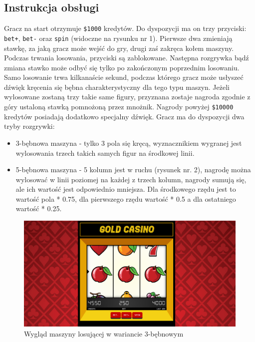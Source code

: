 \documentclass[a4paper,11pt,titlepage]{article}
\begin{document}
\subsection{Instrukcja obsługi}
Gracz na start otrzymuje \verb|$1000| kredytów. Do dyspozycji ma on trzy przyciski: \verb|bet+|, \verb|bet-| oraz \verb|spin| (widoczne na rysunku nr 1). Pierwsze dwa zmieniają stawkę, za jaką gracz może wejść do gry, drugi zaś zakręca kołem maszyny. Podczas trwania losowania, przyciski są zablokowane. Następna rozgrywka bądź zmiana stawko może odbyć się tylko po zakończonym poprzednim losowaniu. Samo losowanie trwa kilkanaście sekund, podczas którego gracz może usłyszeć dźwięk kręcenia się bębna charakterystyczny dla tego typu maszyn. Jeżeli wylosowane zostaną trzy takie same figury, przyznana zostaje nagroda zgodnie z góry ustaloną stawką pomnożoną przez mnożnik. Nagrody powyżej \verb|$10000| kredytów posiadają dodatkowo specjalny dźwięk. Gracz ma do dyspozycji dwa tryby rozgrywki:
\begin{itemize}
	\item 3-bębnowa maszyna - tylko 3 pola się kręcą, wyznacznikiem wygranej jest wylosowania trzech takich samych figur na środkowej linii.
	\item 5-bębnowa maszyna - 5 kolumn jest w ruchu (rysunek nr. 2), nagrodę można wylosować w linii poziomej na każdej z trzech kolumn, nagrody sumują się, ale ich wartość jest odpowiednio mniejsza. Dla środkowego rzędu jest to wartość pola * 0.75, dla pierwszego rzędu wartość * 0.5 a dla ostatniego wartość * 0.25.
\end{itemize}

\begin{figure}[H]
\centering
\includegraphics[width=1\columnwidth]{img/screen.PNG}
\caption{Wygląd maszyny losującej w wariancie 3-bębnowym} 
\end{figure}
\end{document}
